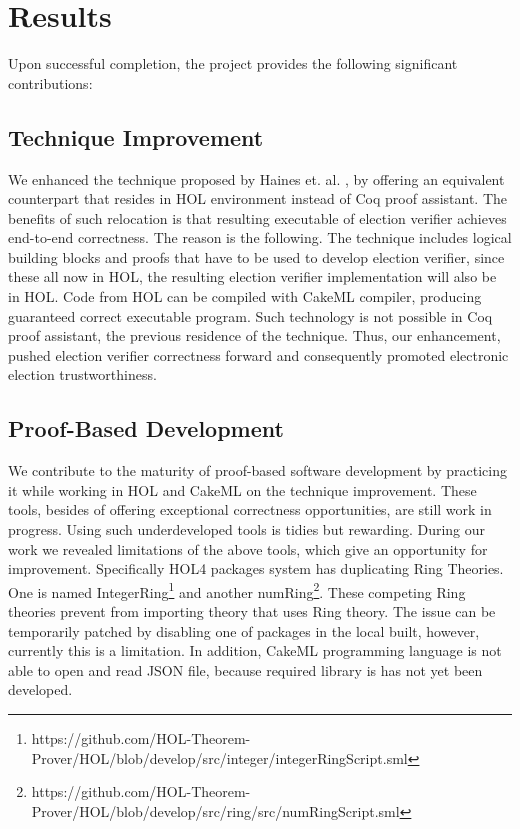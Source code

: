 \chapter{Results}
Upon successful completion, the project provides the following significant contributions:

\section{Technique Improvement} 
We enhanced the technique  proposed by Haines et. al. \cite{Haines2019VerifiedVF}, by offering an equivalent 
counterpart that resides in HOL environment instead of Coq proof assistant. The benefits of such relocation
 is that resulting executable of election verifier achieves end-to-end correctness. The reason is the following. 
 The technique includes logical building blocks and proofs that have to be used to develop election verifier, 
 since these all now in HOL, the resulting election verifier implementation will also be in HOL. Code from HOL 
 can be compiled with CakeML compiler, producing guaranteed correct executable program. Such technology is not 
 possible in Coq proof assistant, the previous residence of the technique. Thus, our enhancement, pushed election 
 verifier correctness forward and consequently promoted electronic election trustworthiness.

\section{Proof-Based Development}
 We contribute to the maturity of proof-based software development by practicing 
 it while working in HOL and CakeML on the technique improvement. These tools, 
 besides of offering exceptional correctness opportunities, are still work in 
 progress. Using such underdeveloped tools is tidies but rewarding. During our 
 work we revealed limitations of the above tools, which give an opportunity for 
 improvement. Specifically HOL4 packages system has duplicating Ring Theories. One is 
 named IntegerRing\footnote{https://github.com/HOL-Theorem-Prover/HOL/blob/develop/src/integer/integerRingScript.sml} and 
 another numRing\footnote{https://github.com/HOL-Theorem-Prover/HOL/blob/develop/src/ring/src/numRingScript.sml}. 
 These competing Ring theories prevent from importing theory that uses Ring theory. 
 The issue can be temporarily patched by disabling one of packages in the local built, however, 
 currently this is a limitation. In addition, CakeML programming language is not able to open and read 
 JSON file, because required library is has not yet been developed.

